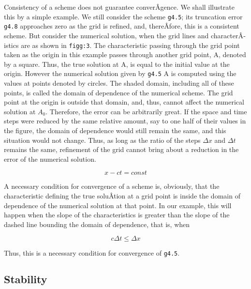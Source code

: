 Consistency of a scheme does not guarantee converÂ­gence. We shall
illustrate this by a simple example. We still consider the scheme
\texttt{g4.5}; its truncation error \texttt{g4.8} approaches zero as the
grid is refined, and, thereÂ­fore, this is a consistent scheme. But
consider the numerical solution, when the grid lines and
characterÂ­istics are as shown in \texttt{figg:3}. The characteristic
passing through the grid point taken as the origin in this example
passes through another grid point, A, denoted by a square. Thus, the
true solution at A, is equal to the initial value at the origin. However
the numerical solution given by \texttt{g4.5} A is computed using the
values at points denoted by circles. The shaded domain, including all of
these points, is called the domain of dependence of the numerical
scheme. The grid point at the origin is outside that domain, and, thus,
cannot affect the numerical solution at \(A_0\). Therefore, the error
can be arbitrarily great. If the space and time steps were reduced by
the same relative amount, say to one half of their values in the figure,
the domain of dependence would still remain the same, and this situation
would not change. Thus, as long as the ratio of the steps \(\Delta x\)
and \(\Delta t\) remains the same, refinement of the grid cannot bring
about a reduction in the error of the numerical solution.

\[x - ct = const\]

\begin{figure}
\centering
{}
\caption{}
\end{figure}

A necessary condition for convergence of a scheme is, obviously, that
the characteristic defining the true soluÂ­tion at a grid point is inside
the domain of dependence of the numerical solution at that point. In our
example, this will happen when the slope of the characteristics is
greater than the slope of the dashed line bounding the domain of
dependence, that is, when

{\[c\Delta t \leq \Delta x\]}

Thus, this is a necessary condition for convergence of \texttt{g4.5}.

\subsection{\texorpdfstring{\textbf{Stability}}{Stability}}\label{stability}

